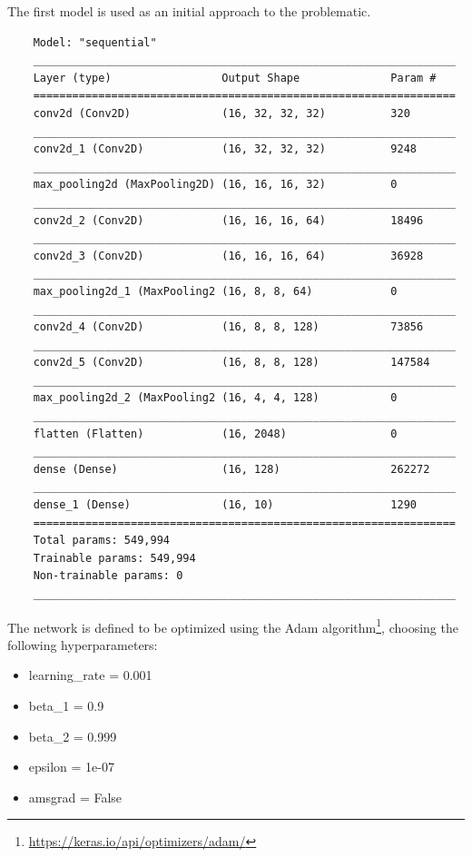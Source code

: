 The first model is used as an initial approach to the problematic.
\begin{center}
    \begin{verbatim}
    Model: "sequential"
    _________________________________________________________________
    Layer (type)                 Output Shape              Param #   
    =================================================================
    conv2d (Conv2D)              (16, 32, 32, 32)          320       
    _________________________________________________________________
    conv2d_1 (Conv2D)            (16, 32, 32, 32)          9248      
    _________________________________________________________________
    max_pooling2d (MaxPooling2D) (16, 16, 16, 32)          0         
    _________________________________________________________________
    conv2d_2 (Conv2D)            (16, 16, 16, 64)          18496     
    _________________________________________________________________
    conv2d_3 (Conv2D)            (16, 16, 16, 64)          36928     
    _________________________________________________________________
    max_pooling2d_1 (MaxPooling2 (16, 8, 8, 64)            0         
    _________________________________________________________________
    conv2d_4 (Conv2D)            (16, 8, 8, 128)           73856     
    _________________________________________________________________
    conv2d_5 (Conv2D)            (16, 8, 8, 128)           147584    
    _________________________________________________________________
    max_pooling2d_2 (MaxPooling2 (16, 4, 4, 128)           0         
    _________________________________________________________________
    flatten (Flatten)            (16, 2048)                0         
    _________________________________________________________________
    dense (Dense)                (16, 128)                 262272    
    _________________________________________________________________
    dense_1 (Dense)              (16, 10)                  1290      
    =================================================================
    Total params: 549,994
    Trainable params: 549,994
    Non-trainable params: 0
    _________________________________________________________________
    \end{verbatim}
\end{center}
The network is defined to be optimized using the Adam algorithm\footnote{\href{https://keras.io/api/optimizers/adam/}{https://keras.io/api/optimizers/adam/}},
choosing the following hyperparameters:
\begin{itemize}
    \item learning\_rate = 0.001
    \item beta\_1 = 0.9
    \item beta\_2 = 0.999
    \item epsilon = 1e-07
    \item amsgrad = False
\end{itemize}
